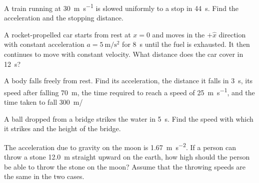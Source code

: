 \documentclass [hw]{exam}
\begin{document}
\begin{questions}
\question A train running at \SI{30}{\meter\per\second} is slowed uniformly to a stop in \SI{44}{\second}. Find the acceleration and the stopping distance.

\question A rocket-propelled car starts from rest at $x=0$ and moves in the $+\hat{x}$ direction with constant acceleration $a=\SI{5}{\meter\per\second\squared}$ for \SI{8}{\second} until the fuel is exhausted. It then continues to move with constant velocity. What distance does the car cover in \SI{12}{\second}?

\question A body falls freely from rest. Find its acceleration, the distance it falls in \SI{3}{\second}, its speed after falling \SI{70}{\meter}, the time required to reach a speed of \SI{25}{\meter\per\second}, and the time taken to fall \SI{300}{\meter}/ 

\question A ball dropped from a bridge strikes the water in \SI{5}{\second}. Find the speed with which it strikes and the height of the bridge. 

\question The acceleration due to gravity on the moon is \SI{1.67}{\meter\per\second\squared}. If a person can throw a stone \SI{12.0}{\meter} straight upward on the earth, how high should the person be able to throw the stone on the moon? Assume that the throwing speeds are the same in the two cases. 
\end{questions}
\end{document}
